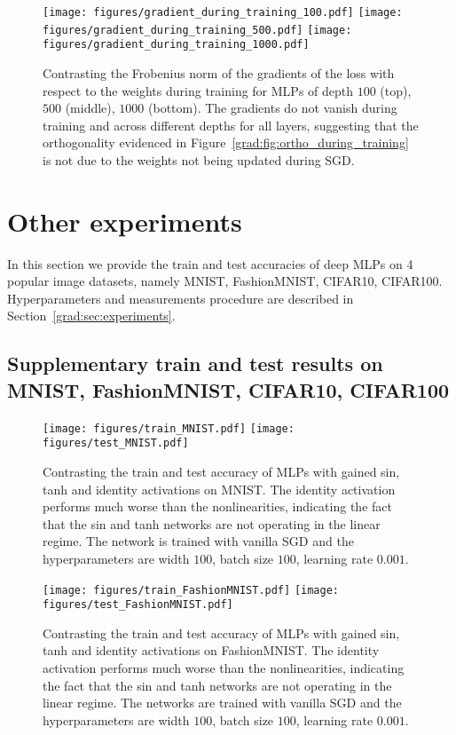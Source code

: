 \begin{figure}[htp!]
    \centering
    \texttt{[image: figures/gradient\_during\_training\_100.pdf]}
    \texttt{[image: figures/gradient\_during\_training\_500.pdf]}
    \texttt{[image: figures/gradient\_during\_training\_1000.pdf]}
    \caption{Contrasting the Frobenius norm of the gradients of the loss with respect to the weights during training for MLPs of depth $100$ (top), $500$ (middle), $1000$ (bottom). The gradients do not vanish during training and across different depths for all layers, suggesting that the orthogonality evidenced in Figure~\ref{grad:fig:ortho_during_training} is not due to the weights not being updated during SGD.}
    \label{grad:fig:gradient_during_training}
\end{figure}


\section{Other experiments}
\label{grad:sec:other_experiments}
In this section we provide the train and test accuracies of deep MLPs on 4 popular image datasets, namely MNIST, FashionMNIST, CIFAR10, CIFAR100. Hyperparameters and measurements procedure are described in Section~\ref{grad:sec:experiments}.

\subsection*{Supplementary train and test results on MNIST, FashionMNIST, CIFAR10, CIFAR100}

\begin{figure}[ht]
    \centering
    \texttt{[image: figures/train\_MNIST.pdf]}
    \texttt{[image: figures/test\_MNIST.pdf]}
    \caption{Contrasting the train and test accuracy of MLPs with gained sin, tanh and identity activations on MNIST. The identity activation performs much worse than the nonlinearities, indicating the fact that the sin and tanh networks are not operating in the linear regime. The network is trained with vanilla SGD and the hyperparameters are width $100$, batch size $100$, learning rate $0.001$.}
    \label{grad:fig:mnist}
\end{figure}

\begin{figure}[ht]
    \centering
    \texttt{[image: figures/train\_FashionMNIST.pdf]}
    \texttt{[image: figures/test\_FashionMNIST.pdf]}
    \caption{Contrasting the train and test accuracy of MLPs with gained sin, tanh and identity activations on FashionMNIST. The identity activation performs much worse than the nonlinearities, indicating the fact that the sin and tanh networks are not operating in the linear regime. The networks are trained with vanilla SGD and the hyperparameters are width $100$, batch size $100$, learning rate $0.001$.}
    \label{grad:fig:fashionmnist}
\end{figure}

